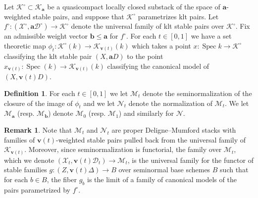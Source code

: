 \documentclass[11pt]{amsart}
\theoremstyle{definition}
\newtheorem{definition}[theorem]{Definition}
\newtheorem{remark}[theorem]{Remark}
\theoremstyle{remark}
\newcommand{\calX}{\mathcal X}
\newcommand{\calD}{\mathcal D}
\newcommand{\sK}{\mathscr{K}}
\newcommand{\sM}{\mathscr{M}}
\newcommand{\sN}{\mathscr{N}}
\newcommand{\Spec}{\operatorname{Spec}}
\newcommand{\bfa}{\mathbf{a}}
\newcommand{\bfv}{\mathbf{v}}
\newcommand{\bfb}{\mathbf{b}}
\begin{document}
	Let $\sK^\circ \subset \sK_{\bfa}$ be a quasicompact locally closed substack of the space of $\bfa$-weighted stable pairs, and  suppose that $\sK^\circ$ parametrizes klt pairs. Let $f^\circ : (\calX^\circ, \bfa \calD^\circ) \to \sK^\circ$ denote the universal family of klt stable pairs over $\sK^\circ$. Fix an admissible weight vector $\bfb \le \bfa$ for $f^\circ$. For each $t \in [0,1]$ we have a set theoretic map
	$
	\phi_t : \sK^\circ(k) \to \sK_{\bfv(t)}(k)
	$
	which takes a point $x : \Spec k \to \sK^\circ$ classifying the klt stable pair $(X, \bfa D)$ to the point $x_{\bfv(t)} : \Spec( k) \to \sK_{\bfv(t)}(k)$ classifying the canonical model of $(X, \bfv(t) D)$. 
	
	\begin{definition} For each $t \in [0,1]$ we let $\sM_{t}$ denote the seminormalization of the closure of the image of $\phi_t$ and we let $\sN_t$ denote the normalization of $\sM_t$. We let $\sM_{\bfa}$ (resp. $\sM_{\bfb}$) denote $\sM_0$ (resp. $\sM_1$) and similarly for $\sN$. 
	\end{definition}
	
	\begin{remark} Note that $\sM_t$ and $\sN_t$ are proper Deligne--Mumford stacks with families of $\bfv(t)$-weighted stable pairs pulled back from the universal family of $\sK_{\bfv(t)}$. Moreover, since seminormalization is functorial, the family over $\sM_t$, which we denote $(\calX_{t}, \bfv(t) \calD_t) \to \sM_t$, is the universal family for the functor of stable families $g : (Z, \bfv(t) \Delta) \to B$ over seminormal base schemes $B$ such that for each $b \in B$, the fiber $g_b$ is the limit of a family of canonical models of the pairs parametrized by $f^\circ$. 
	\end{remark}
	
\end{document}
